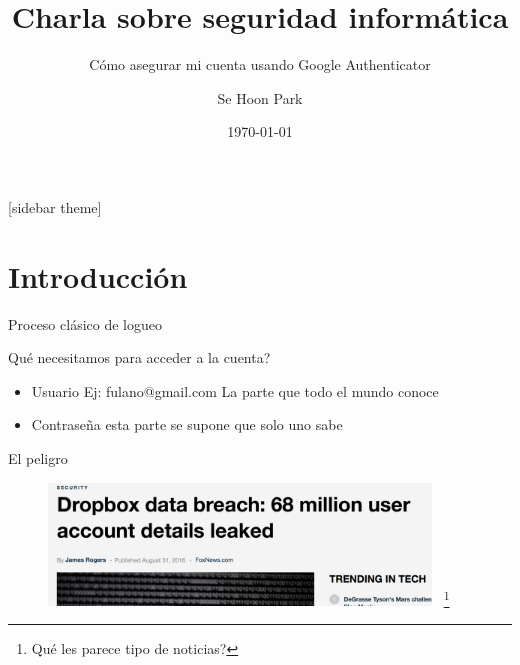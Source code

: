 \documentclass[11pt]{beamer}
\title[]{Charla sobre seguridad inform\'atica}
\subtitle[]{C\'omo asegurar mi cuenta usando Google Authenticator}
\author[]{Se Hoon Park}
\date[]{\today}
\let\oldfootnote\footnote
\renewcommand\footnote[1][]{\oldfootnote[frame,#1]}
\begin{document}
\begin{frame}[plain]
\titlepage
\end{frame}
[sidebar theme]



\section{Introducci\'on}
\begin{frame}{Proceso cl\'asico de logueo}\footnotesize
  \begin{block}{Qu\'e necesitamos para acceder a la cuenta?}
    \begin{itemize}
      \item<2-> Usuario Ej: fulano@gmail.com La parte que todo el mundo conoce
      \item<3-> Contrase\~na  esta parte se supone que solo uno sabe
    \end{itemize}
  \end{block}
\end{frame}
\begin{frame}{El peligro}
  \begin{figure}[ht]
    \begin{center}
      \includegraphics[width=4in]{images/noticia-dropbox.png}
	~\footnote{Qu\'e les parece tipo de noticias?}
    \end{center}
  \end{figure}
\end{frame}
\end{document}
